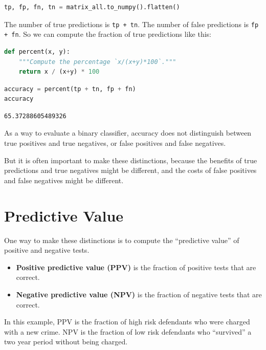 \begin{lstlisting}[language=Python]
tp, fp, fn, tn = matrix_all.to_numpy().flatten()
\end{lstlisting}

The number of true predictions is \passthrough{\lstinline!tp + tn!}. The
number of false predictions is \passthrough{\lstinline!fp + fn!}. So we
can compute the fraction of true predictions like this:

\begin{lstlisting}[language=Python]
def percent(x, y):
    """Compute the percentage `x/(x+y)*100`."""
    return x / (x+y) * 100
\end{lstlisting}

\begin{lstlisting}[language=Python]
accuracy = percent(tp + tn, fp + fn)
accuracy
\end{lstlisting}

\begin{lstlisting}[]
65.37288605489326
\end{lstlisting}

As a way to evaluate a binary classifier, accuracy does not distinguish
between true positives and true negatives, or false positives and false
negatives.

But it is often important to make these distinctions, because the
benefits of true predictions and true negatives might be different, and
the costs of false positives and false negatives might be different.

\hypertarget{predictive-value}{%
\section{Predictive Value}\label{predictive-value}}

One way to make these distinctions is to compute the ``predictive
value'' of positive and negative tests.

\begin{itemize}
\item
  \textbf{Positive predictive value (PPV)} is the fraction of positive
  tests that are correct.
\item
  \textbf{Negative predictive value (NPV)} is the fraction of negative
  tests that are correct.
\end{itemize}

In this example, PPV is the fraction of high risk defendants who were
charged with a new crime. NPV is the fraction of low risk defendants who
``survived'' a two year period without being charged.

